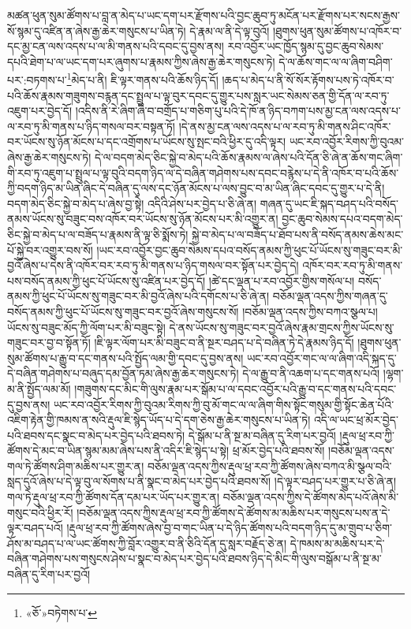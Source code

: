 མཚན་ཕུན་སུམ་ཚོགས་པ་བླ་ན་མེད་པ་ཡང་དག་པར་རྫོགས་པའི་བྱང་ཆུབ་ཏུ་མངོན་པར་རྫོགས་པར་སངས་རྒྱས་སོ་སྙམ་དུ་འཛིན་ན་ཞེས་རྒྱ་ཆེར་གསུངས་པ་ཡིན་ཏེ། དེ་རྣམ་ལ་ནི་དེ་ལྟ་བུའོ། །ཐུགས་ཕུན་སུམ་ཚོགས་པ་འཁོར་བ་དང་མྱ་ངན་ལས་འདས་པ་ལ་མི་གནས་པའི་དབང་དུ་བྱས་ནས། རབ་འབྱོར་ཡང་ཁྱོད་སྙམ་དུ་བྱང་ཆུབ་སེམས་དཔའི་ཐེག་པ་ལ་ཡང་དག་པར་ཞུགས་པ་རྣམས་ཀྱིས་ཞེས་རྒྱ་ཆེར་གསུངས་ཏེ། དེ་ལ་ཆོས་གང་ལ་ལ་ཞིག་བཤིག་པར་:བཏགས་པ་\footnote{«ཅོ་»བཏེགས་པ་}མེད་པ་ནི། ཇི་ལྟར་གནས་པའི་ཆོས་ཉིད་དོ། །ཆད་པ་མེད་པ་ནི་སོ་སོར་རྟོགས་པས་ཏེ་འཁོར་བ་པའི་ཆོས་རྣམས་གཟུགས་བརྙན་དང་སྤྲུལ་པ་ལྟ་བུར་དབང་དུ་གྱུར་པས་སླར་ཡང་སེམས་ཅན་གྱི་དོན་ལ་རབ་ཏུ་འཇུག་པར་བྱེད་དོ། །འདིས་ནི་རེ་ཞིག་ཞི་བ་བགྲོད་པ་གཅིག་པུ་པའི་དེ་ཁོ་ན་ཉིད་བཀག་པས་མྱ་ངན་ལས་འདས་པ་ལ་རབ་ཏུ་མི་གནས་པ་ཉིད་གསལ་བར་བསྟན་ཏོ། །དེ་ནས་མྱ་ངན་ལས་འདས་པ་ལ་རབ་ཏུ་མི་གནས་ཤིང་འཁོར་བར་ཡོངས་སུ་ཉོན་མོངས་པ་དང་འགྲོགས་པ་ཡོངས་སུ་སྤང་བའི་ཕྱིར་དུ་འདི་ལྟར། ཡང་རབ་འབྱོར་རིགས་ཀྱི་བུའམ་ཞེས་རྒྱ་ཆེར་གསུངས་ཏེ། དེ་ལ་བདག་མེད་ཅིང་སྐྱེ་བ་མེད་པའི་ཆོས་རྣམས་ལ་ཞེས་པའི་དོན་ཅི་ཞེ་ན་ཆོས་གང་ཞིག་གི་རབ་ཏུ་འཇུག་པ་སྤྲུལ་པ་ལྟ་བུའི་བདག་ཉིད་ལ་དེ་བཞིན་གཤེགས་པས་དབང་བརྙེས་པ་དེ་ནི་འཁོར་བ་པའི་ཆོས་ཀྱི་བདག་ཉིད་མ་ཡིན་ཞིང་དེ་བཞིན་དུ་ལས་དང་ཉོན་མོངས་པ་ལས་བྱུང་བ་མ་ཡིན་ཞིང་དབང་དུ་གྱུར་པ་དེ་ནི། བདག་མེད་ཅིང་སྐྱེ་བ་མེད་པ་ཞེས་བྱ་སྟེ། འདིའི་ཤེས་པར་བྱེད་པ་ཅི་ཞེ་ན། གཞན་དུ་ཡང་ཇི་སྐད་བཤད་པའི་བསོད་ནམས་ཡོངས་སུ་བཟུང་བས་འཁོར་བར་ཡོངས་སུ་ཉོན་མོངས་པར་མི་འགྱུར་ན། བྱང་ཆུབ་སེམས་དཔའ་བདག་མེད་ཅིང་སྐྱེ་བ་མེད་པ་ལ་བཟོད་པ་རྣམས་ནི་ལྟ་ཅི་སྨོས་ཏེ། སྐྱེ་བ་མེད་པ་ལ་བཟོད་པ་ཐོབ་པས་ནི་བསོད་ནམས་ཆེས་མང་པོ་སྐྱེ་བར་འགྱུར་བས་སོ། །ཡང་རབ་འབྱོར་བྱང་ཆུབ་སེམས་དཔའ་བསོད་ནམས་ཀྱི་ཕུང་པོ་ཡོངས་སུ་གཟུང་བར་མི་བྱའོ་ཞེས་པ་དེས་ནི་འཁོར་བར་རབ་ཏུ་མི་གནས་པ་ཉིད་གསལ་བར་སྟོན་པར་བྱེད་དེ། འཁོར་བར་རབ་ཏུ་མི་གནས་པས་བསོད་ནམས་ཀྱི་ཕུང་པོ་ཡོངས་སུ་འཛིན་པར་བྱེད་དོ། །ཚེ་དང་ལྡན་པ་རབ་འབྱོར་གྱིས་གསོལ་པ། བསོད་ནམས་ཀྱི་ཕུང་པོ་ཡོངས་སུ་གཟུང་བར་མི་བྱའོ་ཞེས་པའི་དགོངས་པ་ཅི་ཞེ་ན། བཅོམ་ལྡན་འདས་ཀྱིས་གཞན་དུ་བསོད་ནམས་ཀྱི་ཕུང་པོ་ཡོངས་སུ་གཟུང་བར་བྱའོ་ཞེས་གསུངས་སོ། །བཅོམ་ལྡན་འདས་ཀྱིས་བཀའ་སྩལ་པ། ཡོངས་སུ་བཟུང་མོད་ཀྱི་ལོག་པར་མི་བཟུང་སྟེ། དེ་ནས་ཡོངས་སུ་གཟུང་བར་བྱའོ་ཞེས་རྣམ་གྲངས་ཀྱིས་ཡོངས་སུ་གཟུང་བར་བྱ་བ་སྟོན་ཏོ། །ཇི་ལྟར་ལོག་པར་མི་བཟུང་བ་ནི་སྔར་བཤད་པ་དེ་བཞིན་ཏེ་དེ་རྣམས་ཉིད་དོ། །ཐུགས་ཕུན་སུམ་ཚོགས་པ་རྒྱུ་བ་དང་གནས་པའི་སྤྱོད་ལམ་གྱི་དབང་དུ་བྱས་ནས། ཡང་རབ་འབྱོར་གང་ལ་ལ་ཞིག་འདི་སྐད་དུ་དེ་བཞིན་གཤེགས་པ་བཞུད་དམ་བྱོན་ཏམ་ཞེས་རྒྱ་ཆེར་གསུངས་ཏེ། དེ་ལ་རྒྱུ་བ་ནི་འཆག་པ་དང་གནས་པའོ། །ལྷག་མ་ནི་སྤྱོད་ལམ་མོ། །གཟུགས་དང་མིང་གི་ལུས་རྣམ་པར་སྒོམ་པ་ལ་དབང་འབྱོར་པའི་རྒྱུ་བ་དང་གནས་པའི་དབང་དུ་བྱས་ནས། ཡང་རབ་འབྱོར་རིགས་ཀྱི་བུའམ་རིགས་ཀྱི་བུ་མོ་གང་ལ་ལ་ཞིག་གིས་སྟོང་གསུམ་གྱི་སྟོང་ཆེན་པོའི་འཇིག་རྟེན་གྱི་ཁམས་ན་སའི་རྡུལ་ཇི་སྙེད་ཡོད་པ་དེ་དག་ཅེས་རྒྱ་ཆེར་གསུངས་པ་ཡིན་ཏེ། འདི་ལ་ཡང་ཕྲ་མོར་བྱེད་པའི་ཐབས་དང་སྣང་བ་མེད་པར་བྱེད་པའི་ཐབས་ཏེ། དེ་སྒོམ་པ་ནི་སྔ་མ་བཞིན་དུ་རིག་པར་བྱའོ། །རྡུལ་ཕྲ་རབ་ཀྱི་ཚོགས་དེ་མང་བ་ཡིན་སྙམ་མམ་ཞེས་པས་ནི་འདིར་ཇི་སྙེད་པ་སྟེ། ཕྲ་མོར་བྱེད་པའི་ཐབས་སོ། །བཅོམ་ལྡན་འདས་གལ་ཏེ་ཚོགས་ཤིག་མཆིས་པར་གྱུར་ན། བཅོམ་ལྡན་འདས་ཀྱིས་རྡུལ་ཕྲ་རབ་ཀྱི་ཚོགས་ཞེས་བཀའ་མི་སྩལ་བའི་སླད་དུའོ་ཞེས་པ་དེ་ལྟ་བུ་ལ་སོགས་པ་ནི་སྣང་བ་མེད་པར་བྱེད་པའི་ཐབས་སོ། །དེ་ལྟར་བཤད་པར་གྱུར་པ་ཅི་ཞེ་ན། གལ་ཏེ་རྡུལ་ཕྲ་རབ་ཀྱི་ཚོགས་དོན་དམ་པར་ཡོད་པར་གྱུར་ན། བཅོམ་ལྡན་འདས་ཀྱིས་དེ་ཚོགས་མེད་པའོ་ཞེས་མི་གསུང་བའི་ཕྱིར་རོ། །བཅོམ་ལྡན་འདས་ཀྱིས་རྡུལ་ཕྲ་རབ་ཀྱི་ཚོགས་དེ་ཚོགས་མ་མཆིས་པར་གསུངས་པས་ན་དེ་ལྟར་བཤད་པའོ། །རྡུལ་ཕྲ་རབ་ཀྱི་ཚོགས་ཞེས་བྱ་བ་གང་ཡིན་པ་དེ་ཉིད་ཚོགས་པའི་བདག་ཉིད་དུ་མ་གྲུབ་པ་ཅིག་ཤོས་མ་བཤད་པ་ལ་ཡང་ཚོགས་ཀྱི་བློར་འགྱུར་བ་ནི་ཅིའི་དོན་དུ་སླར་བརྗོད་ཅེ་ན། དེ་ཁམས་མ་མཆིས་པར་དེ་བཞིན་གཤེགས་པས་གསུངས་ཤེས་པ་སྣང་བ་མེད་པར་བྱེད་པའི་ཐབས་ཉིད་དེ་མིང་གི་ལུས་བསྒོམ་པ་ནི་སྔ་མ་བཞིན་དུ་རིག་པར་བྱའོ། 